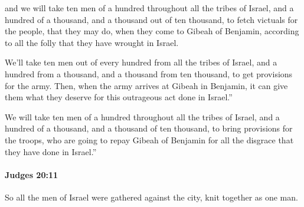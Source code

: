 			\begin{versebox}
					\item[BHS] 
					\item[ASV] and we will take ten men of a hundred throughout all the tribes of Israel, and a hundred of a thousand, and a thousand out of ten thousand, to fetch victuals for the people, that they may do, when they come to Gibeah of Benjamin, according to all the folly that they have wrought in Israel.
					\item[NIV] We’ll take ten men out of every hundred from all the tribes of Israel, and a hundred from a thousand, and a thousand from ten thousand, to get provisions for the army. Then, when the army arrives at Gibeah in Benjamin, it can give them what they deserve for this outrageous act done in Israel.”
					\item[NRSV] We will take ten men of a hundred throughout all the tribes of Israel, and a hundred of a thousand, and a thousand of ten thousand, to bring provisions for the troops, who are going to repay Gibeah of Benjamin for all the disgrace that they have done in Israel.”
			\end{versebox}

		\paragraph{Judges 20:11} %
			\label{JUDGES-20-11}

			So all the men of Israel were gathered against the city, knit together as one man.

